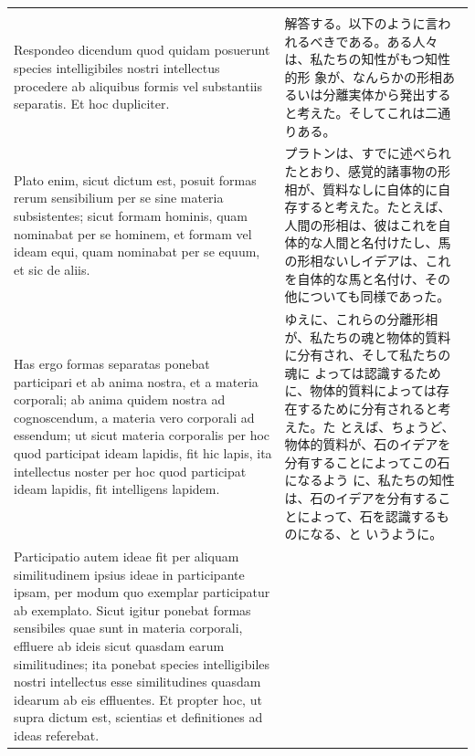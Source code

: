 \documentclass[paper=a4paper,fontsize=10pt,jafontsize=9pt,titlepage]{jlreq}
\begin{document}
\begin{longtable}{p{21em}p{21em}}
  
&



\\[1em]


 Respondeo dicendum quod quidam posuerunt species intelligibiles nostri
 intellectus procedere ab aliquibus formis vel substantiis separatis. Et hoc
 dupliciter.
 
&

解答する。以下のように言われるべきである。ある人々は、私たちの知性がもつ知性的形
象が、なんらかの形相あるいは分離実体から発出すると考えた。そしてこれは二通りある。

\\[1em]

 Plato enim, sicut dictum est, posuit formas rerum sensibilium per se sine
 materia subsistentes; sicut formam hominis, quam nominabat per se hominem, et
 formam vel ideam equi, quam nominabat per se equum, et sic de aliis.

 &

 プラトンは、すでに述べられたとおり、感覚的諸事物の形相が、質料なしに自体的に自
 存すると考えた。たとえば、人間の形相は、彼はこれを自体的な人間と名付けたし、馬
 の形相ないしイデアは、これを自体的な馬と名付け、その他についても同様であった。

\\[1em]

 Has ergo formas separatas ponebat participari et ab anima nostra, et a materia
 corporali; ab anima quidem nostra ad cognoscendum, a materia vero corporali ad
 essendum; ut sicut materia corporalis per hoc quod participat ideam lapidis,
 fit hic lapis, ita intellectus noster per hoc quod participat ideam lapidis,
 fit intelligens lapidem.
  
&

ゆえに、これらの分離形相が、私たちの魂と物体的質料に分有され、そして私たちの魂に
よっては認識するために、物体的質料によっては存在するために分有されると考えた。た
とえば、ちょうど、物体的質料が、石のイデアを分有することによってこの石になるよう
に、私たちの知性は、石のイデアを分有することによって、石を認識するものになる、と
いうように。

\\[1em]


Participatio autem ideae fit per aliquam similitudinem ipsius ideae in
participante ipsam, per modum quo exemplar participatur ab exemplato. Sicut
igitur ponebat formas sensibiles quae sunt in materia corporali, effluere ab
ideis sicut quasdam earum similitudines; ita ponebat species intelligibiles
nostri intellectus esse similitudines quasdam idearum ab eis effluentes. Et
propter hoc, ut supra dictum est, scientias et definitiones ad ideas referebat.
 

\end{longtable}
\end{document}
